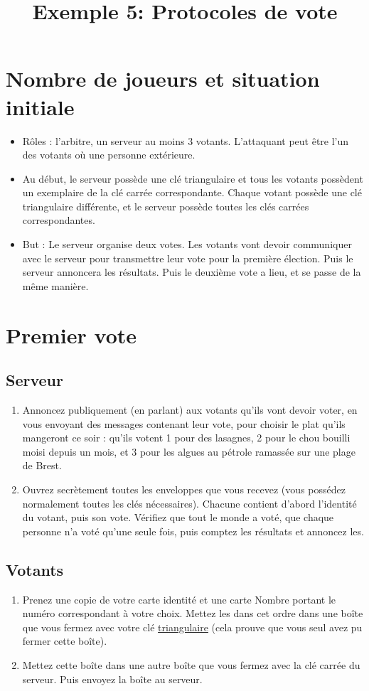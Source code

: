 \documentclass[a4paper,10pt]{article}
\title{Exemple 5: Protocoles de vote}
\date{}
\begin{document}
\maketitle

\section{Nombre de joueurs et situation initiale}
\begin{itemize}
	\item Rôles : l'arbitre, un serveur au moins 3 votants. L'attaquant peut être l'un des votants où une personne extérieure.
	\item Au début, le serveur possède une clé triangulaire et tous les votants possèdent un exemplaire de la clé carrée correspondante. Chaque votant possède une clé triangulaire différente, et le serveur possède toutes les clés carrées correspondantes.
	\item But : Le serveur organise deux votes. Les votants vont devoir communiquer avec le serveur pour transmettre leur vote pour la première élection. Puis le serveur annoncera les résultats. Puis le deuxième vote a lieu, et se passe de la même manière.
\end{itemize}


\section{Premier vote}
\subsection{Serveur}
	\begin{enumerate}
		\item Annoncez publiquement (en parlant) aux votants qu'ils vont devoir voter, en vous envoyant des messages contenant leur vote, pour choisir le plat qu'ils mangeront ce soir : qu'ils votent 1 pour des lasagnes, 2 pour le chou bouilli moisi depuis un mois, et 3 pour les algues au pétrole ramassée sur une plage de Brest.
		\item Ouvrez secrètement toutes les enveloppes que vous recevez (vous possédez normalement toutes les clés nécessaires). Chacune contient d'abord l'identité du votant, puis son vote. Vérifiez que tout le monde a voté, que chaque personne n'a voté qu'une seule fois, puis comptez les résultats et annoncez les.
	\end{enumerate}

\subsection{Votants}
	\begin{enumerate}
		\item Prenez une copie de votre carte identité et une carte Nombre portant le numéro correspondant à votre choix. Mettez les dans cet ordre dans une boîte que vous fermez avec votre clé \underline{triangulaire} (cela prouve que vous seul avez pu fermer cette boîte).
		\item Mettez cette boîte dans une autre boîte que vous fermez avec la clé carrée du serveur. Puis envoyez la boîte au serveur.
	\end{enumerate}
\end{document}
